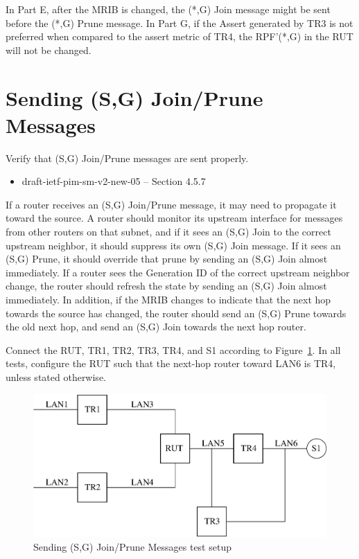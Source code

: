 \documentclass[11pt]{report}
\begin{document}
In Part E, after the MRIB is changed, the (*,G) Join message might
be sent before the (*,G) Prune message. In Part G, if the Assert generated by
TR3 is not preferred when compared to the assert metric of TR4, the RPF'(*,G)
in the RUT will not be changed.

\newpage
\section{Sending (S,G) Join/Prune Messages}

Verify that (S,G) Join/Prune messages are sent properly.

\begin{itemize}
  \item draft-ietf-pim-sm-v2-new-05 -- Section 4.5.7
\end{itemize}

If a router receives an (S,G) Join/Prune message, it may need to propagate
it toward the source. A router should monitor its upstream
interface for messages
from other routers on that subnet, and if it sees an (S,G) Join to the
correct upstream neighbor, it should suppress its own (S,G) Join message.
If it sees an (S,G) Prune, it should override that prune by sending an
(S,G) Join almost immediately. If a router sees the Generation ID of the
correct upstream neighbor change, the router should refresh the state by
sending an (S,G) Join almost immediately. In addition, if the MRIB changes
to indicate that the next hop towards the source has changed, the router should
send an (S,G) Prune towards the old next hop, and send an (S,G) Join
towards the next hop router.

Connect the RUT, TR1, TR2, TR3, TR4, and S1 according to
Figure~\ref{fig:pim_test_4_7_sending_sg_join_prune_messages}.
In all tests, configure the RUT such that the next-hop router toward LAN6 is
TR4, unless stated otherwise.

\begin{figure}[htbp]
  \begin{center}
    \includegraphics[scale=0.8]{figs/pim_test_4_7_sending_sg_join_prune_messages}
    \caption{Sending (S,G) Join/Prune Messages test setup}
    \label{fig:pim_test_4_7_sending_sg_join_prune_messages}
  \end{center}
\end{figure}
\end{document}
